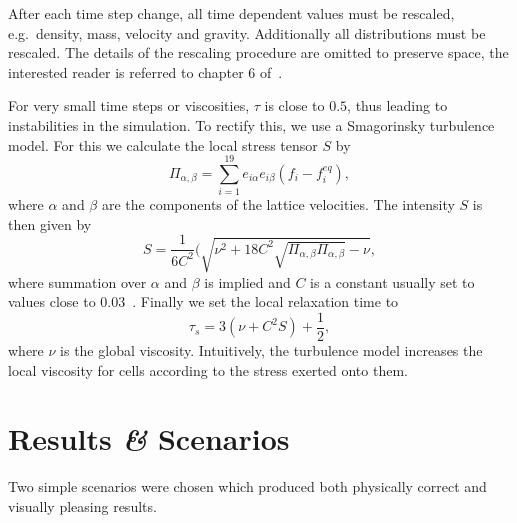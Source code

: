 \documentclass[10pt,a4paper,notitlepage]{article}
\begin{document}
After each time step change, all time dependent values must be rescaled, e.g.~density, mass, velocity and gravity.
Additionally all distributions must be rescaled.
The details of the rescaling procedure are omitted to preserve space, the interested reader is referred to chapter 6 of~\cite{thurey2007physically}.

For very small time steps or viscosities, $\tau$ is close to $0.5$, thus leading to instabilities in the simulation.
To rectify this, we use a Smagorinsky turbulence model.
For this we calculate the local stress tensor $S$ by
\begin{equation} \label{eq:stress}
\Pi_{\alpha,\beta}=\sum^{19}_{i=1}e_{i\alpha}e_{i\beta}(f_{i}-f_{i}^{eq}),
\end{equation}
where $\alpha$ and $\beta$ are the components of the lattice velocities.
 The intensity $S$ is then given by 
\begin{equation} \label{eq:intensity}
S=\frac{1}{6C^{2}}(\sqrt{\nu^{2}+18C^{2}\sqrt{\Pi_{\alpha,\beta} \Pi_{\alpha,\beta}}-\nu},
\end{equation}
where summation over $\alpha$ and $\beta$ is implied and $C$ is a constant usually set to values close to $0.03$~\cite{thurey2007physically}.
Finally we set the local relaxation time to
\begin{equation} \label{eq:relax}
\tau_s=3(\nu+C^{2}S)+\frac{1}{2},
\end{equation}
where $\nu$ is the global viscosity.
Intuitively, the turbulence model increases the local viscosity for cells according to the stress exerted onto them.

\section{Results \textit{\&} Scenarios}
Two simple scenarios were chosen which produced both physically correct and visually pleasing results.
\end{document}
